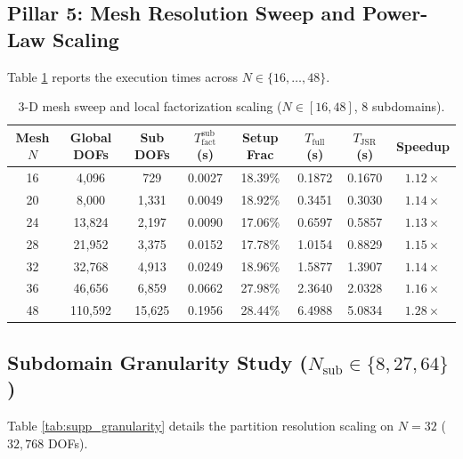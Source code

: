 \documentclass[11pt,a4paper]{article}
\begin{document}
\subsection{Pillar 5: Mesh Resolution Sweep and Power-Law Scaling}
Table \ref{tab:supp_p5} reports the execution times across $N \in \{16, \dots, 48\}$.

\begin{table}[htbp]
\centering
\small
\caption{3-D mesh sweep and local factorization scaling ($N \in [16, 48]$, 8 subdomains).}
\label{tab:supp_p5}
\begin{tabular}{cccccccc}
\toprule
Mesh $N$ & Global DOFs & Sub DOFs & $T_{\text{fact}}^{\text{sub}}$ (s) & Setup Frac & $T_{\text{full}}$ (s) & $T_{\text{JSR}}$ (s) & Speedup \\
\midrule
16 & 4,096   & 729    & 0.0027 & 18.39\% & 0.1872 & 0.1670 & $1.12\times$ \\
20 & 8,000   & 1,331  & 0.0049 & 18.92\% & 0.3451 & 0.3030 & $1.14\times$ \\
24 & 13,824  & 2,197  & 0.0090 & 17.06\% & 0.6597 & 0.5857 & $1.13\times$ \\
28 & 21,952  & 3,375  & 0.0152 & 17.78\% & 1.0154 & 0.8829 & $1.15\times$ \\
32 & 32,768  & 4,913  & 0.0249 & 18.96\% & 1.5877 & 1.3907 & $1.14\times$ \\
36 & 46,656  & 6,859  & 0.0662 & 27.98\% & 2.3640 & 2.0328 & $1.16\times$ \\
48 & 110,592 & 15,625 & 0.1956 & 28.44\% & 6.4988 & 5.0834 & $\mathbf{1.28\times}$ \\
\bottomrule
\end{tabular}
\end{table}

\subsection{Subdomain Granularity Study ($N_{\text{sub}} \in \{8, 27, 64\}$)}
Table \ref{tab:supp_granularity} details the partition resolution scaling on $N=32$ ($32,768$ DOFs).
\end{document}
